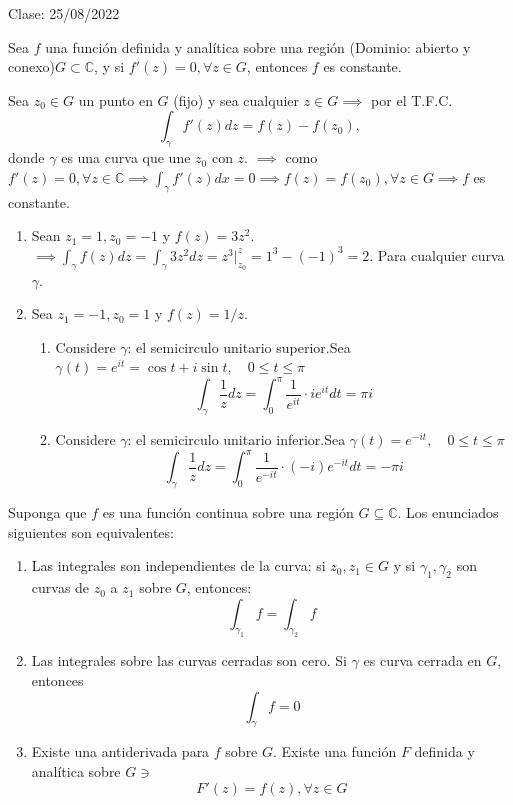 Clase: 25/08/2022

\begin{prop}
    Sea $f$ una función definida y analítica sobre una región (Dominio: abierto y conexo)$G\subset \mathbb{C}$, y si $f'(z)=0,\forall z\in G$, entonces $f$ es constante.
    \begin{dem}
        Sea $z_0\in G$ un punto en $G$ (fijo) y sea cualquier $z\in G\implies$ por el T.F.C.
            $$\int_\gamma f'(z)dz=f(z)-f(z_0),$$
            donde $\gamma$ es una curva que une $z_0$ con $z$. $\implies$ como $f'(z)=0,\forall z\in\mathbb{C}\implies \int_\gamma f'(z)dx=0\implies f(z)=f(z_0),\forall z\in G\implies f$ es constante. 
    \end{dem} 
\end{prop}

\begin{ejemplo}
    \begin{enumerate}
        \item Sean $z_1=1,z_0=-1$ y $f(z)=3z^2$. $\implies \int_\gamma f(z)dz=\int_\gamma 3z^2dz=z^3|_{z_0}^z=1^3-(-1)^3=2$. Para cualquier curva $\gamma$.
        \item Sea $z_1=-1,z_0=1$ y $f(z)=1/z$.
        \begin{enumerate}
            \item Considere $\gamma$: el semicirculo unitario superior.Sea $\gamma(t)=e^{it}=\cos t+i\sin t,\quad 0\leq t\leq \pi$
            $$\int_\gamma \frac{1}{z}dz=\int_0^\pi \frac{1}{e^{it}}\cdot ie^{it}dt = \pi i$$
            \item Considere $\gamma$: el semicirculo unitario inferior.Sea $\gamma(t)=e^{-it},\quad 0\leq t\leq \pi$
            $$\int_\gamma \frac{1}{z}dz=\int_0^\pi \frac{1}{e^{-it}}\cdot (-i)e^{-it}dt = -\pi i$$
        \end{enumerate}
        
    \end{enumerate}
\end{ejemplo}

\begin{teorema}
    Suponga que $f$ es una función continua sobre una región $G\subseteq \mathbb{C}$. Los enunciados siguientes son equivalentes:
    \begin{enumerate}
        \item Las integrales son independientes de la curva: si $z_0,z_1\in G$ y si $\gamma_1,\gamma_2$ son curvas de $z_0$ a $z_1$ sobre $G$, entonces:
            $$\int_{\gamma_1}f=\int_{\gamma_2}f$$
        \item Las integrales sobre las curvas cerradas son cero. Si $\gamma$ es curva cerrada en $G$, entonces 
        $$\int_\gamma f=0$$
        \item Existe una antiderivada para $f$ sobre $G$. Existe una función $F$ definida y analítica sobre $G\ni$
        $$F'(z)=f(z),\forall z\in G$$
    \end{enumerate}
\end{teorema}

